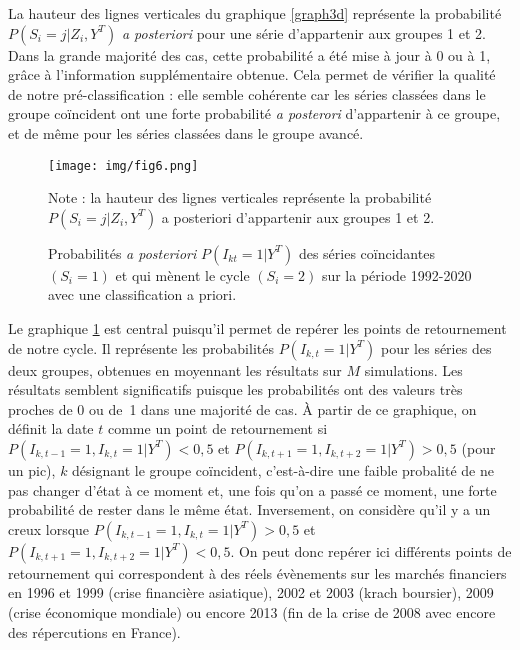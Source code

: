 \documentclass[10pt,french,french]{article}
\begin{document}
La hauteur des lignes verticales du graphique \ref{graph3d} représente la probabilité \(P(S_i = j|Z_i,Y^T)\) \emph{a posteriori} pour une série d'appartenir aux groupes 1 et 2.
Dans la grande majorité des cas, cette probabilité a été mise à jour à 0 ou à 1, grâce à l'information supplémentaire obtenue.
Cela permet de vérifier la qualité de notre pré-classification : elle semble cohérente car les séries classées dans le groupe coïncident ont une forte probabilité \emph{a posterori} d'appartenir à ce groupe, et de même pour les séries classées dans le groupe avancé.

\begin{figure}[htb]
\centering
\texttt{[image: img/fig6.png]}
\caption{Probabilités \textit{a posteriori} $P(I_{kt}=1|Y^T)$ des séries coïncidantes $(S_i=1)$ et qui mènent le cycle $(S_i=2)$ sur la période 1992-2020 avec une classification a priori.}\label{retournements}
\footnotesize
Note : la hauteur des lignes verticales représente la probabilité $P(S_i = j|Z_i,Y^T)$ a posteriori d'appartenir aux groupes 1 et 2.
\end{figure}

Le graphique \ref{retournements} est central puisqu'il permet de repérer les points de retournement de notre cycle.
Il représente les probabilités \(P(I_{k,t} = 1|Y^T)\) pour les séries des deux groupes, obtenues en moyennant les résultats sur \(M\) simulations.
Les résultats semblent significatifs puisque les probabilités ont des valeurs très proches de 0 ou de~1 dans une majorité de cas.
À partir de ce graphique, on définit la date \(t\) comme un point de retournement si \(P(I_{k,t-1} = 1, I_{k,t} = 1 | Y^T) < 0,5\) et \(P(I_{k,t+1} = 1, I_{k,t+2} = 1 | Y^T) > 0,5\) (pour un pic), \(k\) désignant le groupe coïncident, c'est-à-dire une faible probalité de ne pas changer d'état à ce moment et, une fois qu'on a passé ce moment, une forte probabilité de rester dans le même état. Inversement, on considère qu'il y a un creux lorsque \(P(I_{k,t-1} = 1, I_{k,t} = 1 | Y^T) > 0,5\) et \(P(I_{k,t+1} = 1, I_{k,t+2} = 1 | Y^T) < 0,5\).
On peut donc repérer ici différents points de retournement qui correspondent à des réels évènements sur les marchés financiers en 1996 et 1999 (crise financière asiatique), 2002 et 2003 (krach boursier), 2009 (crise économique mondiale) ou encore 2013 (fin de la crise de 2008 avec encore des répercutions en France).
\end{document}
